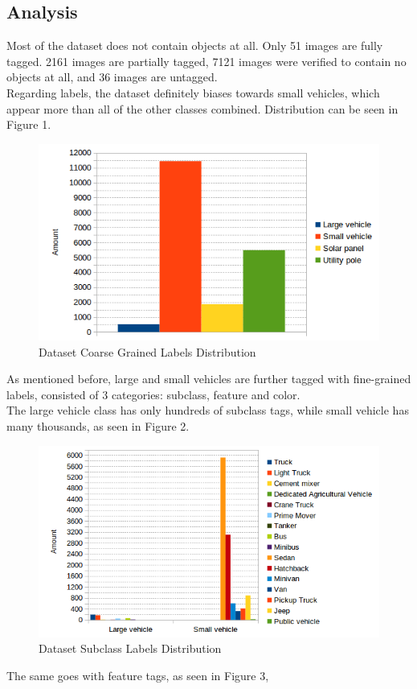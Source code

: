 \documentclass[]{article}
\begin{document}
\subsection{Analysis}
Most of the dataset does not contain objects at all. Only 51 images are fully tagged. 2161 images are partially tagged, 7121 images were verified to contain no objects at all, and 36 images are untagged.\\
Regarding labels, the dataset definitely biases towards small vehicles, which appear more than all of the other classes combined. Distribution can be seen in Figure 1.
\begin{figure}[!h]
\centering
\includegraphics[width=0.7\linewidth]{"charts/Dataset Coarse Grained Labels Distribution"}
\caption{Dataset Coarse Grained Labels Distribution}
\label{fig:Dataset Coarse Grained Labels Distribution}
\end{figure}
As mentioned before, large and small vehicles are further tagged with fine-grained labels, consisted of 3 categories: subclass, feature and color.\\
The large vehicle class has only hundreds of subclass tags, while small vehicle has many thousands, as seen in Figure 2.
\begin{figure}[!h]
\centering
\includegraphics[width=0.7\linewidth]{"charts/Dataset Subclass Labels Distribution"}
\caption{Dataset Subclass Labels Distribution}
\label{fig:Dataset Subclass Labels Distribution}
\end{figure}
The same goes with feature tags, as seen in Figure 3,
\end{document}
